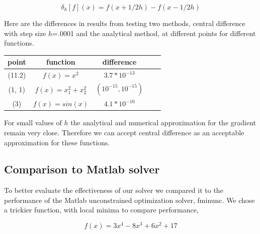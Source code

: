 \documentclass[10pt,twocolumn]{article}
\begin{document}
\begin{equation}
\delta_h[f](x) = f(x+1/2h) - f(x-1/2h)
\end{equation}

Here are the differences in results from testing two methods, central difference with step size $h$=.0001 and the analytical method, at different points for different functions.

\begin{center}
  \begin{tabular}{ | c | c | c | c | c | }
    \hline
     point & function  & difference \\ \hline
     (11.2) & $f(x) = x^2$ & $3.7*10^{-13}$ \\ \hline
     (1, 1) & $f(x) = x_1^2+ x_2^2$ & $(10^{-15}, 10^{-15})$ \\ \hline
     (3) & $f(x) = sin(x)$ & $4.1*10^{-10}$ \\ 
    \hline
  \end{tabular}
\end{center}

For small values of $h$ the analytical and numerical approximation for the gradient remain very close. Therefore we can accept central difference as an acceptable approximation for these functions.

\subsection*{Comparison to Matlab solver}

To better evaluate the effectiveness of our solver we compared it to the performance of the Matlab unconstrained optimization solver, fminunc. We chose a trickier function, with local minima to compare performance, 

\begin{equation}
f(x)= 3x^4-8x^3+6x^2+17
\end{equation}
\end{document}
